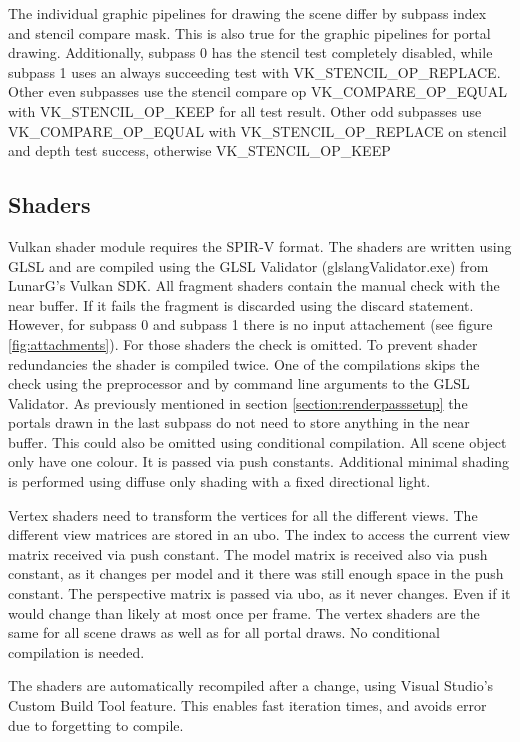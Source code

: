 The individual  graphic pipelines for drawing the scene differ by subpass index and stencil compare mask. This is also true for the graphic pipelines for portal drawing. Additionally, subpass 0 has the stencil test completely disabled, while subpass 1 uses an always succeeding test with VK\_STENCIL\_OP\_REPLACE. Other even subpasses use the stencil compare op VK\_COMPARE\_OP\_EQUAL with VK\_STENCIL\_OP\_KEEP for all test result. Other odd subpasses use VK\_COMPARE\_OP\_EQUAL with VK\_STENCIL\_OP\_REPLACE on stencil and depth test success, otherwise VK\_STENCIL\_OP\_KEEP

\subsection{Shaders}
Vulkan shader module requires the SPIR-V format. The shaders are written using GLSL and are compiled using the GLSL Validator (glslangValidator.exe) from LunarG's Vulkan SDK. All fragment shaders contain the manual check with the near buffer. If it fails the fragment is discarded using the discard statement. However, for subpass 0 and subpass 1 there is no input attachement (see figure \ref{fig:attachments}). For those shaders the check is omitted. To prevent shader redundancies the shader is compiled twice. One of the compilations skips the check using the preprocessor and by command line arguments to the GLSL Validator. As previously mentioned in section \ref{section:renderpasssetup} the portals drawn in the last subpass do not need to store anything in the near buffer. This could also be omitted using conditional compilation. All scene object only have one colour. It is passed via push constants. Additional minimal shading is performed using diffuse only shading with a fixed directional light.

Vertex shaders need to transform the vertices for all the different views. The different view matrices are stored in an \gls{ubo}. The index to access the current view matrix received via push constant. The model matrix is received also via push constant, as it changes per model and it there was still enough space in the push constant. The perspective matrix is passed via \gls{ubo}, as it never changes. Even if it would change than likely at most once per frame. The vertex shaders are the same for all scene draws as well as for all portal draws. No conditional compilation is needed.


The shaders are automatically recompiled after a change, using Visual Studio's Custom Build Tool feature. This enables fast iteration times, and avoids error due to forgetting to compile.

